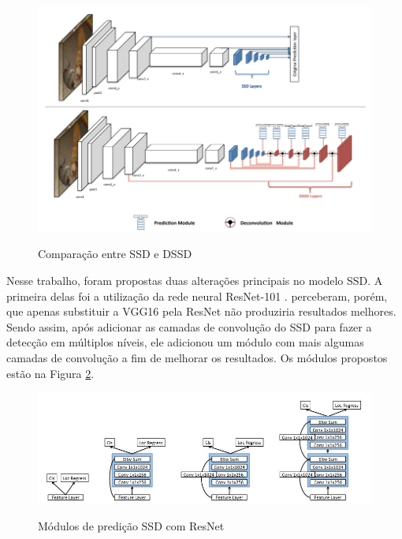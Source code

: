 \begin{figure}[H]
	\setlength{\abovecaptionskip}{0pt}
	\setlength{\belowcaptionskip}{0pt}
	\caption[SSD e DSSD]{Comparação entre \ac{SSD} e \ac{DSSD}}
	\centering
	\includegraphics[width=.8\textwidth]{imagem/0x_comparacao_ssd_dssd.png}
	\captionsetup{justification=centering}
	\label{fig:ssdxdssd}
\end{figure}

Nesse trabalho, foram propostas duas alterações principais no modelo \ac{SSD}. A primeira delas foi a utilização da rede neural ResNet-101 \cite{he-2016}.  perceberam, porém, que apenas substituir a VGG16 pela \ac{ResNet} não produziria resultados melhores. Sendo assim, após adicionar as camadas de convolução do \ac{SSD} para fazer a detecção em múltiplos níveis, ele adicionou um módulo com mais algumas camadas de convolução a fim de melhorar os resultados. Os módulos propostos estão na Figura \ref{fig:ssdpred}.

\begin{figure}[H]
	\setlength{\abovecaptionskip}{0pt}
	\setlength{\belowcaptionskip}{0pt}
	\caption[Módulos de predição SSD com ResNet]{Módulos de predição \ac{SSD} com \ac{ResNet}}
	\centering
	\includegraphics[width=.8\textwidth]{imagem/0x_dssdpredmod.jpg}
	\captionsetup{justification=centering}
	\label{fig:ssdpred}
\end{figure}

